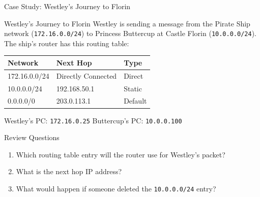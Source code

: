 \documentclass[aspectratio=169]{beamer}  %
\begin{document}
\begin{frame}{Case Study: Westley's Journey to Florin}
    \begin{casestudy}{Westley's Journey to Florin}
        \small
        Westley is sending a message from the Pirate Ship network (\texttt{172.16.0.0/24}) to Princess Buttercup at Castle Florin (\texttt{10.0.0.0/24}). The ship's router has this routing table:
        
        \vspace{0.2em}
        \footnotesize
        \begin{center}
            \begin{tabular}{l l l}
                \toprule
                \textbf{Network} & \textbf{Next Hop} & \textbf{Type} \\
                \midrule
                172.16.0.0/24 & Directly Connected & Direct \\
                10.0.0.0/24 & 192.168.50.1 & Static \\
                0.0.0.0/0 & 203.0.113.1 & Default \\
                \bottomrule
            \end{tabular}
        \end{center}
        
        \small
        Westley's PC: \texttt{172.16.0.25} \quad Buttercup's PC: \texttt{10.0.0.100}
    \end{casestudy}
    
    \begin{block}{Review Questions}
        \small
        \begin{enumerate}\setlength{\itemsep}{1pt}
            \item Which routing table entry will the router use for Westley's packet?
            \item What is the next hop IP address?
            \item What would happen if someone deleted the \texttt{10.0.0.0/24} entry?
        \end{enumerate}
    \end{block}
\end{frame}
\end{document}
